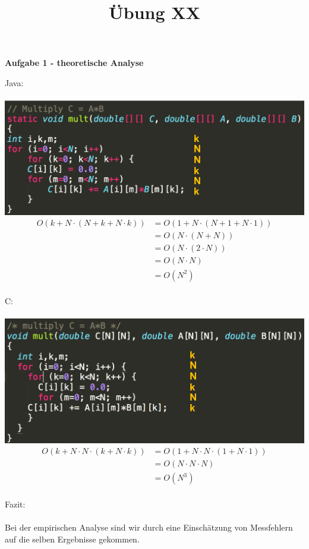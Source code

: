 \documentclass[a4paper,11pt]{scrartcl}
\title{Übung XX}
\begin{document}
\begin{center}
\LARGE{\textbf{Aufgabe 1 - theoretische Analyse}}
\end{center}
Java:\\\\
\includegraphics[width=.7\textwidth]{java.png}\\
\begin{align*}
	O(k + N\cdot (N + k+ N\cdot k))&=O(1+N\cdot(N+1+N\cdot 1))\\
	&=O(N\cdot(N+N))\\
	&=O(N\cdot(2\cdot N))\\
	&=O(N\cdot N)\\
	&=O(N^2)
\end{align*}
\\
C:\\\\
\includegraphics[width=.7\textwidth]{c.png}\\
\begin{align*}
O(k + N\cdot N\cdot(k + N\cdot k))&=O(1 + N\cdot N\cdot(1 + N\cdot 1))\\
&=O(N\cdot N\cdot N)\\
&=O(N^3)
\end{align*}
\\
Fazit:\\\\
Bei der empirischen Analyse sind wir durch eine Einschätzung von Messfehlern auf die selben Ergebnisse gekommen.
\end{document}
